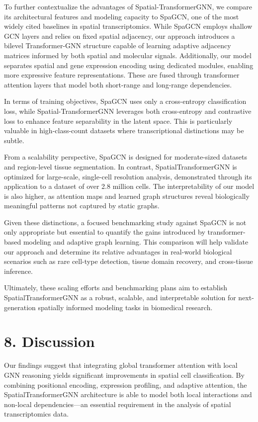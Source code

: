 \documentclass[unnumsec,webpdf,contemporary,medium]{oup-authoring-template}
\begin{document}
To further contextualize the advantages of Spatial-TransformerGNN, we compare its architectural features and modeling capacity to SpaGCN, one of the most widely cited baselines in spatial transcriptomics. While SpaGCN employs shallow GCN layers and relies on fixed spatial adjacency, our approach introduces a bilevel Transformer-GNN structure capable of learning adaptive adjacency matrices informed by both spatial and molecular signals. Additionally, our model separates spatial and gene expression encoding using dedicated modules, enabling more expressive feature representations. These are fused through transformer attention layers that model both short-range and long-range dependencies.

In terms of training objectives, SpaGCN uses only a cross-entropy classification loss, while Spatial-TransformerGNN leverages both cross-entropy and contrastive loss to enhance feature separability in the latent space. This is particularly valuable in high-class-count datasets where transcriptional distinctions may be subtle.

From a scalability perspective, SpaGCN is designed for moderate-sized datasets and region-level tissue segmentation. In contrast, SpatialTransformerGNN is optimized for large-scale, single-cell resolution analysis, demonstrated through its application to a dataset of over 2.8 million cells. The interpretability of our model is also higher, as attention maps and learned graph structures reveal biologically meaningful patterns not captured by static graphs.

Given these distinctions, a focused benchmarking study against SpaGCN is not only appropriate but essential to quantify the gains introduced by transformer-based modeling and adaptive graph learning. This comparison will help validate our approach and determine its relative advantages in real-world biological scenarios such as rare cell-type detection, tissue domain recovery, and cross-tissue inference.

Ultimately, these scaling efforts and benchmarking plans aim to establish SpatialTransformerGNN as a robust, scalable, and interpretable solution for next-generation spatially informed modeling tasks in biomedical research.

\section*{8. Discussion}

Our findings suggest that integrating global transformer attention with local GNN reasoning yields significant improvements in spatial cell classification. By combining positional encoding, expression profiling, and adaptive attention, the SpatialTransformerGNN architecture is able to model both local interactions and non-local dependencies—an essential requirement in the analysis of spatial transcriptomics data.
\end{document}
